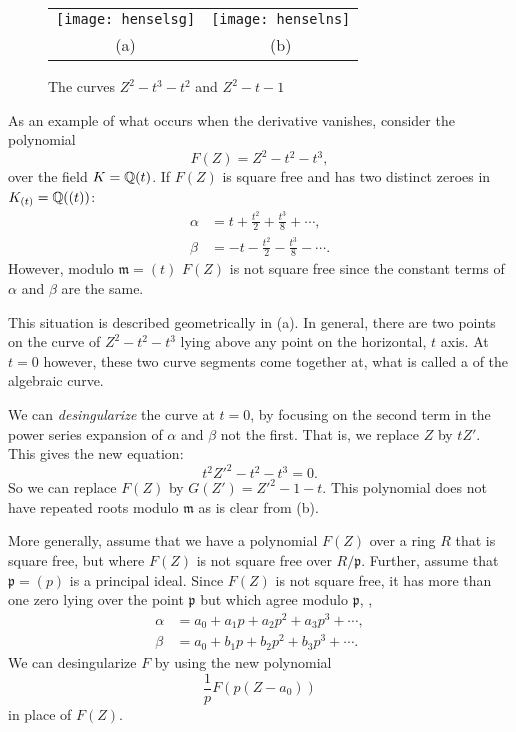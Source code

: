 \begin{figure}
\begin{center}
\begin{tabular}{cc}
\texttt{[image: henselsg]} &
\texttt{[image: henselns]} \\
(a) & (b)
\end{tabular}
\end{center}
\caption{The curves $Z^2 - t^3 -t^2$ and $Z^2 - t -1$
 \label{HenselSing:Fig}}
\end{figure}

As an example of what occurs when the derivative vanishes, consider
the polynomial
\[
F(Z) = Z^2 - t^2 - t^3,
\]
over the field $K = \mathbb{Q}(t)$.  If $F(Z)$ is square free and has two
distinct zeroes in $K_{(t)} = \mathbb{Q}((t))$:
\[
\begin{aligned}
\alpha & = t + \frac{t^2}{2} + \frac{t^3}{8} + \cdots, \\
\beta & =  - t - \frac{t^2}{2} - \frac{t^3}{8} - \cdots.
\end{aligned}
\]
However, modulo $\mathfrak{m} = (t)$ $F(Z)$ is not square free since the
constant terms of $\alpha$ and $\beta$ are the same.  

This situation is described geometrically in
(a).  In general, there are two points on the 
curve of $Z^2 - t^2 - t^3$ lying above any point on the horizontal,
$t$ axis.  At $t=0$ however, these two curve segments come together
at, what is called a  of the algebraic curve.

We can {\em desingularize} the curve at $t=0$, by focusing on the
second term in the power series expansion of $\alpha$ and $\beta$ not
the first.  That is, we replace $Z$ by $t Z'$.  This gives the new
equation:
\[
t^2 {Z'}^2 - t^2 -t^3 = 0.  
\]
So we can replace $F(Z)$ by $G(Z') = {Z'}^2 - 1 -t$.  This polynomial does
not have repeated roots modulo $\mathfrak{m}$ as is clear from
(b). 

More generally, assume that we have a polynomial $F(Z)$ over a ring
$R$ that is square free, but where $F(Z)$ is not square free over
$R/\mathfrak{p}$.  Further, assume that $\mathfrak{p} = (p)$ is a principal
ideal.  Since $F(Z)$ is not square free, it has more than one zero
lying over the point $\mathfrak{p}$ but which agree modulo $\mathfrak{p}$,
\eg,
\[
\begin{aligned}
\alpha & = a_0 + a_1 p + a_2 p^2 + a_3 p^3 + \cdots, \\
\beta  & = a_0 + b_1 p + b_2 p^2 + b_3 p^3 + \cdots.
\end{aligned}
\]
We can desingularize $F$ by using the new polynomial
\[
\frac{1}{p} F(p(Z - a_0))
\]
in place of $F(Z)$.  

